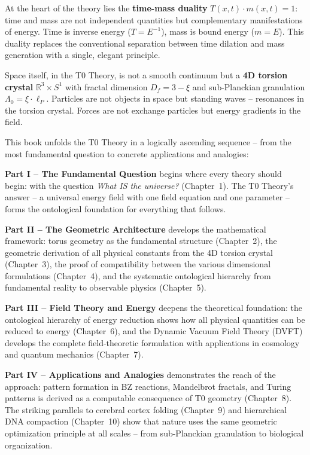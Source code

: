 \documentclass[11pt,openright,twoside]{book}
\begin{document}
At the heart of the theory lies the \textbf{time-mass duality} $T(x,t) \cdot m(x,t) = 1$: time and mass are not independent quantities but complementary manifestations of energy. Time is inverse energy ($T = E^{-1}$), mass is bound energy ($m = E$). This duality replaces the conventional separation between time dilation and mass generation with a single, elegant principle.

Space itself, in the T0 Theory, is not a smooth continuum but a \textbf{4D torsion crystal} $\mathbb{R}^3 \times S^1$ with fractal dimension $D_f = 3 - \xi$ and sub-Planckian granulation $\Lambda_0 = \xi \cdot \ell_P$. Particles are not objects in space but standing waves -- resonances in the torsion crystal. Forces are not exchange particles but energy gradients in the field.

\bigskip

This book unfolds the T0 Theory in a logically ascending sequence -- from the most fundamental question to concrete applications and analogies:

\textbf{Part I -- The Fundamental Question} begins where every theory should begin: with the question \textit{What IS the universe?} (Chapter~1). The T0 Theory's answer -- a universal energy field with one field equation and one parameter -- forms the ontological foundation for everything that follows.

\textbf{Part II -- The Geometric Architecture} develops the mathematical framework: torus geometry as the fundamental structure (Chapter~2), the geometric derivation of all physical constants from the 4D torsion crystal (Chapter~3), the proof of compatibility between the various dimensional formulations (Chapter~4), and the systematic ontological hierarchy from fundamental reality to observable physics (Chapter~5).

\textbf{Part III -- Field Theory and Energy} deepens the theoretical foundation: the ontological hierarchy of energy reduction shows how all physical quantities can be reduced to energy (Chapter~6), and the Dynamic Vacuum Field Theory (DVFT) develops the complete field-theoretic formulation with applications in cosmology and quantum mechanics (Chapter~7).

\textbf{Part IV -- Applications and Analogies} demonstrates the reach of the approach: pattern formation in BZ reactions, Mandelbrot fractals, and Turing patterns is derived as a computable consequence of T0 geometry (Chapter~8). The striking parallels to cerebral cortex folding (Chapter~9) and hierarchical DNA compaction (Chapter~10) show that nature uses the same geometric optimization principle at all scales -- from sub-Planckian granulation to biological organization.
\end{document}
